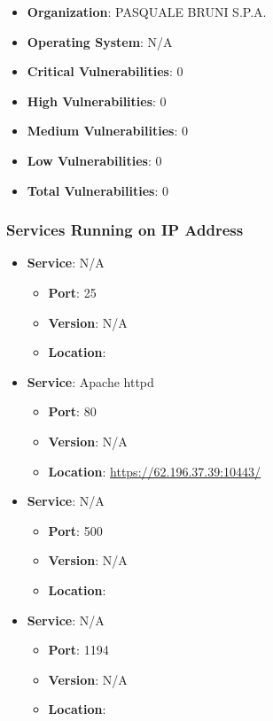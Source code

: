 \documentclass{article}
\begin{document}
\begin{itemize}
    \item \textbf{Organization}: PASQUALE BRUNI S.P.A.
    \item \textbf{Operating System}:  N/A 
    \item \textbf{Critical Vulnerabilities}: 0
    \item \textbf{High Vulnerabilities}: 0
    \item \textbf{Medium Vulnerabilities}: 0
    \item \textbf{Low Vulnerabilities}: 0
    \item \textbf{Total Vulnerabilities}: 0
\end{itemize}

\subsubsection*{Services Running on IP Address}

\begin{itemize}
    
        \item \textbf{Service}: N/A
        \begin{itemize}
            \item \textbf{Port}: 25
            \item \textbf{Version}:  N/A 
            \item \textbf{Location}: \href{  }{  }
        \end{itemize}
    
        \item \textbf{Service}: Apache httpd
        \begin{itemize}
            \item \textbf{Port}: 80
            \item \textbf{Version}:  N/A 
            \item \textbf{Location}: \href{ https://62.196.37.39:10443/ }{ https://62.196.37.39:10443/ }
        \end{itemize}
    
        \item \textbf{Service}: N/A
        \begin{itemize}
            \item \textbf{Port}: 500
            \item \textbf{Version}:  N/A 
            \item \textbf{Location}: \href{  }{  }
        \end{itemize}
    
        \item \textbf{Service}: N/A
        \begin{itemize}
            \item \textbf{Port}: 1194
            \item \textbf{Version}:  N/A 
            \item \textbf{Location}: \href{  }{  }
        \end{itemize}
    
\end{itemize}
\end{document}
